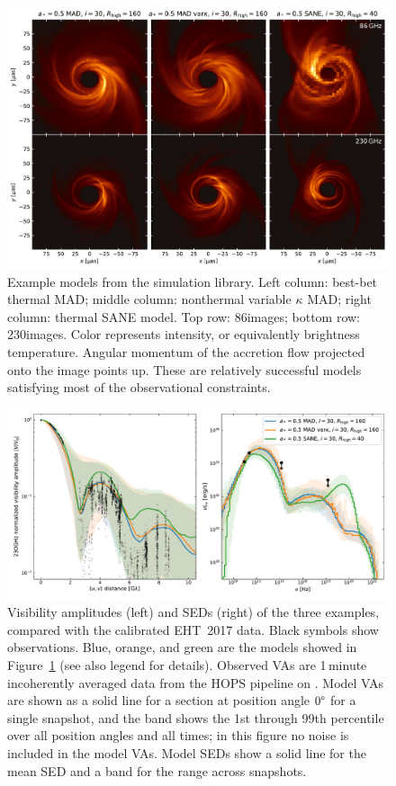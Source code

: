 \begin{figure}
  \centering
  \includegraphics[width=\textwidth]{figures/example_imgs.pdf}
  \caption{Example models from the simulation library.  Left column: best-bet thermal MAD; middle column: nonthermal variable $\kappa$ MAD; right column: thermal SANE model.  Top row: 86\GHz images; bottom row: 230\GHz images.  Color represents intensity, or equivalently brightness temperature.  Angular momentum of the accretion flow projected onto the image points up.  These are relatively successful models satisfying most of the observational  constraints.
  }
  \label{fig:example_imgs}
\end{figure}

\begin{figure}
  \centering
  \includegraphics[width=\textwidth]{figures/example_vas_seds.pdf}
  \caption{Visibility amplitudes (left) and SEDs (right) of the three examples, compared with the calibrated EHT~2017 data.  Black symbols show observations.  Blue, orange, and green are the models showed in Figure~\ref{fig:example_imgs} (see also legend for details).  Observed VAs are 1\,minute incoherently averaged data from the HOPS pipeline on \aprilvii.  Model VAs are shown as a solid line for a section at position angle $0\degree$ for a single snapshot, and the band shows the 1st through 99th percentile over all position angles and all times; in this figure no noise is included in the model VAs.  Model SEDs show a solid line for the mean SED and a band for the range across snapshots.}
  \label{fig:example_vas_seds}
\end{figure}

